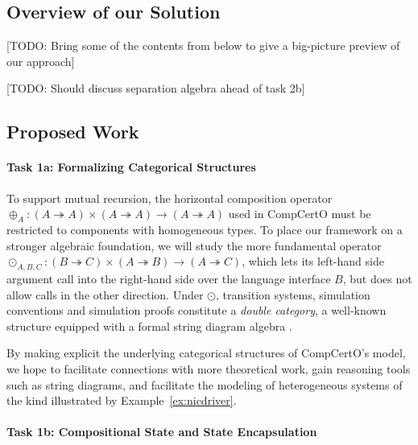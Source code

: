 
\subsection{Overview of our Solution}

[TODO: Bring some of the contents from below to give a big-picture preview
of our approach]

[TODO: Should discuss separation algebra ahead of task 2b]

\subsection{Proposed Work}

\paragraph*{Task 1a: Formalizing Categorical Structures}

To support mutual recursion,
the horizontal composition operator
${\oplus_A} : (A \twoheadrightarrow A) \times (A \twoheadrightarrow A)
  \rightarrow (A \twoheadrightarrow A)$
used in CompCertO
must be restricted to components with homogeneous types.
To place our framework on a stronger algebraic foundation,
we will study the more fundamental operator
${\odot_{A,B,C}} : (B \twoheadrightarrow C) \times (A \twoheadrightarrow B)
  \rightarrow (A \twoheadrightarrow C)$,
which lets its left-hand side argument call into
the right-hand side over the language interface $B$,
but does not allow calls in the other direction.
Under $\odot$,
transition systems, simulation conventions and simulation proofs
constitute a \emph{double category},
a well-known structure equipped with a formal string diagram algebra
\cite{dcsd}.

By making explicit the underlying categorical structures
of CompCertO's model,
we hope to facilitate connections with more theoretical work,
gain reasoning tools such as string diagrams,
and facilitate the modeling of heterogeneous systems
of the kind illustrated by Example~\ref{ex:nicdriver}.

\vspace*{-2ex}
\paragraph*{Task 1b: Compositional State and State Encapsulation}

